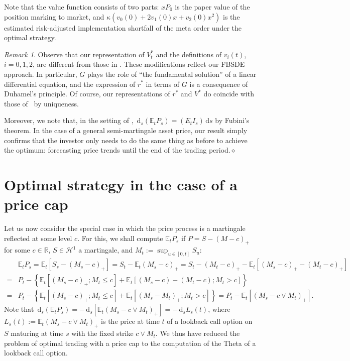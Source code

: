 \documentclass[openany,oneside]{article}
\theoremstyle{definition}
\theoremstyle{remark}
\newtheorem{rem}[thm]{Remark}
\newcommand{\E}{\mathbb{E}} %
\newcommand{\close}{\hspace*{\fill}$\diamond$}
\newcommand{\de}{\,\mathrm{d}}
\begin{document}
Note that the value function consists of two parts: $xP_0$ is the paper value of the position marking to market, and $\kappa(v_0(0)+2v_1(0)x+v_2(0)x^2)$ is the estimated risk-adjusted implementation shortfall of the meta order under the optimal strategy.

\begin{rem}
Observe that our representation of $V^\ast_t$ and the definitions of $v_i(t)$, $i=0,1,2$, are different from those in \cite{lehalle2017incorporating}. These modifications reflect our FBSDE approach. In particular, $G$ plays the role of ``the fundamental solution'' of a linear differential equation, and the expression of $r^\ast$ in terms of $G$ is a consequence of Duhamel's principle. Of course, our representations of $r^\ast$ and $V^\ast$ do coincide with those of~\cite{lehalle2017incorporating} by uniqueness.

Moreover, we note that, in the setting of \cite{lehalle2017incorporating}, $\de_s(\E_t P_s) = (E_t I_s)\de s$ by Fubini's theorem. In the case of a general semi-martingale asset price, our result simply confirms that the investor only needs to do the same thing as before to achieve the optimum: forecasting price trends until the end of the trading period.\close
\end{rem}



\section{Optimal strategy in the case of a price cap}
Let us now consider the special case in which the price process is a martingale reflected at some level $c$. For this, we shall compute $\E_t P_s$ if $P=S-(M-c)_+$ for some $c\in\mathbb{R}$, $S\in\mathcal{H}^1$ a martingale, and $M_t:=\sup_{u\in[0,t]}S_u$:
\begin{align*}
& \E_t P_s = \E_t[S_s-(M_s-c)_+] = S_t-\E_t(M_s-c)_+ = S_t-(M_t-c)_+ - \E_t\left[(M_s-c)_+ - (M_t-c)_+\right] \\
=& P_t -\left\{ \E_t\left[(M_s-c)_+; M_t\le c\right] + \E_t\left[(M_s-c)-(M_t-c); M_t > c\right] \right\} \\
=& P_t -\left\{ \E_t\left[(M_s-c)_+; M_t\le c\right] + \E_t\left[(M_s-M_t)_+; M_t > c\right] \right\} = P_t - \E_t\left[(M_s-c\vee M_t)_+\right].
\end{align*}
Note that $\de_s(\E_t P_s) = -\de_s\left[\E_t(M_s-c\vee M_t)_+\right] = -\de_s L_s(t)$, where $L_s(t):=\E_t(M_s-c\vee M_t)_+$ is the price at time $t$ of a lookback call option on $S$ maturing at time $s$ with the fixed strike $c\vee M_t$. We thus have reduced the problem of optimal trading with a price cap to the computation of the Theta of a lookback call option.
\end{document}
